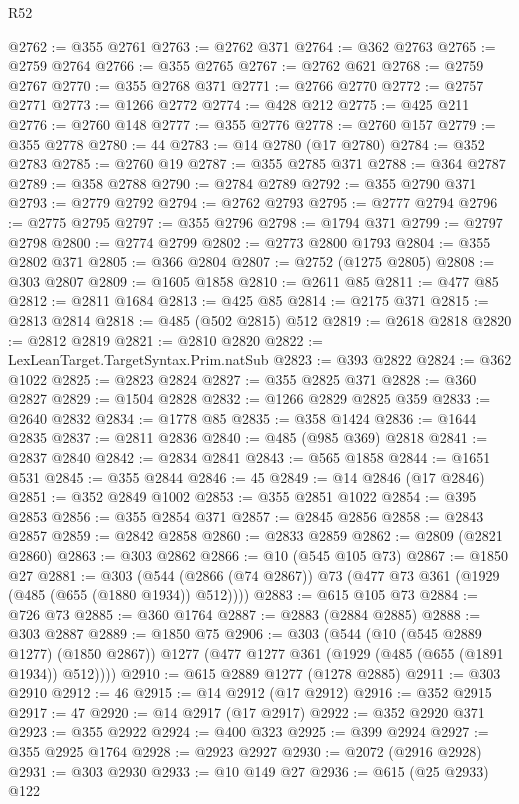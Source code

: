 \begin{lexlean}{R52}
\begin{coremodule}
@2762 := @355 @2761
@2763 := @2762 @371
@2764 := @362 @2763
@2765 := @2759 @2764
@2766 := @355 @2765
@2767 := @2762 @621
@2768 := @2759 @2767
@2770 := @355 @2768 @371
@2771 := @2766 @2770
@2772 := @2757 @2771
@2773 := @1266 @2772
@2774 := @428 @212
@2775 := @425 @211
@2776 := @2760 @148
@2777 := @355 @2776
@2778 := @2760 @157
@2779 := @355 @2778
@2780 := 44
@2783 := @14 @2780 (@17 @2780)
@2784 := @352 @2783
@2785 := @2760 @19
@2787 := @355 @2785 @371
@2788 := @364 @2787
@2789 := @358 @2788
@2790 := @2784 @2789
@2792 := @355 @2790 @371
@2793 := @2779 @2792
@2794 := @2762 @2793
@2795 := @2777 @2794
@2796 := @2775 @2795
@2797 := @355 @2796
@2798 := @1794 @371
@2799 := @2797 @2798
@2800 := @2774 @2799
@2802 := @2773 @2800 @1793
@2804 := @355 @2802 @371
@2805 := @366 @2804
@2807 := @2752 (@1275 @2805)
@2808 := @303 @2807
@2809 := @1605 @1858
@2810 := @2611 @85
@2811 := @477 @85
@2812 := @2811 @1684
@2813 := @425 @85
@2814 := @2175 @371
@2815 := @2813 @2814
@2818 := @485 (@502 @2815) @512
@2819 := @2618 @2818
@2820 := @2812 @2819
@2821 := @2810 @2820
@2822 := LexLeanTarget.TargetSyntax.Prim.natSub
@2823 := @393 @2822
@2824 := @362 @1022
@2825 := @2823 @2824
@2827 := @355 @2825 @371
@2828 := @360 @2827
@2829 := @1504 @2828
@2832 := @1266 @2829 @2825 @359
@2833 := @2640 @2832
@2834 := @1778 @85
@2835 := @358 @1424
@2836 := @1644 @2835
@2837 := @2811 @2836
@2840 := @485 (@985 @369) @2818
@2841 := @2837 @2840
@2842 := @2834 @2841
@2843 := @565 @1858
@2844 := @1651 @531
@2845 := @355 @2844
@2846 := 45
@2849 := @14 @2846 (@17 @2846)
@2851 := @352 @2849 @1002
@2853 := @355 @2851 @1022
@2854 := @395 @2853
@2856 := @355 @2854 @371
@2857 := @2845 @2856
@2858 := @2843 @2857
@2859 := @2842 @2858
@2860 := @2833 @2859
@2862 := @2809 (@2821 @2860)
@2863 := @303 @2862
@2866 := @10 (@545 @105 @73)
@2867 := @1850 @27
@2881 := @303
    (@544 (@2866 (@74 @2867)) @73 (@477 @73 @361 (@1929 (@485 (@655 (@1880 @1934)) @512))))
@2883 := @615 @105 @73
@2884 := @726 @73
@2885 := @360 @1764
@2887 := @2883 (@2884 @2885)
@2888 := @303 @2887
@2889 := @1850 @75
@2906 := @303
    (@544
      (@10 (@545 @2889 @1277) (@1850 @2867))
      @1277
      (@477 @1277 @361 (@1929 (@485 (@655 (@1891 @1934)) @512))))
@2910 := @615 @2889 @1277 (@1278 @2885)
@2911 := @303 @2910
@2912 := 46
@2915 := @14 @2912 (@17 @2912)
@2916 := @352 @2915
@2917 := 47
@2920 := @14 @2917 (@17 @2917)
@2922 := @352 @2920 @371
@2923 := @355 @2922
@2924 := @400 @323
@2925 := @399 @2924
@2927 := @355 @2925 @1764
@2928 := @2923 @2927
@2930 := @2072 (@2916 @2928)
@2931 := @303 @2930
@2933 := @10 @149 @27
@2936 := @615 (@25 @2933) @122

\end{coremodule}
\end{lexlean}
